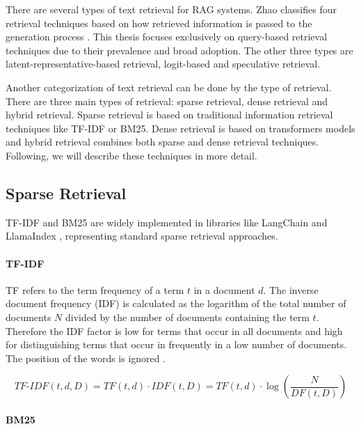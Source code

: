 
There are several types of text retrieval for RAG systems. Zhao classifies four retrieval techniques based on how retrieved information is passed to the generation process \cite{Zhao.29.02.2024}. This thesis focuses exclusively on query-based retrieval techniques due to their prevalence and broad adoption. The other three types are latent-representative-based retrieval, logit-based and speculative retrieval.

Another categorization of text retrieval can be done by the type of retrieval. There are three main types of retrieval: sparse retrieval, dense retrieval and hybrid retrieval. Sparse retrieval is based on traditional information retrieval techniques like TF-IDF or BM25. Dense retrieval is based on transformers models and hybrid retrieval combines both sparse and dense retrieval techniques. Following, we will describe these techniques in more detail.
\subsection{Sparse Retrieval}
\label{sec:sparse_retrieval}

TF-IDF and BM25 are widely implemented in libraries like LangChain \cite{Chase_LangChain_2022} and LlamaIndex \cite{Liu_LlamaIndex_2022}, representing standard sparse retrieval approaches.

\paragraph{TF-IDF}
\label{sec:tfidf}

TF refers to the term frequency of a term $t$ in a document $d$. The inverse document frequency (IDF) is calculated as the logarithm of the total number of documents $N$ divided by the number of documents containing the term $t$. Therefore the IDF factor is low for terms that occur in all documents and high for distinguishing terms that occur in frequently in a low number of documents. The position of the words is ignored \cite{Manning.2009}.

$$\textit{TF-IDF}(t, d, D) = \textit{TF}(t, d) \cdot \textit{IDF}(t, D) = \textit{TF}(t, d) \cdot \log\left(\frac{N}{\textit{DF}(t, D)}\right)
$$

\paragraph{BM25}
\label{sec:bm25}

